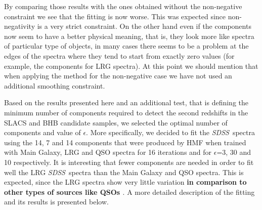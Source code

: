 \documentclass[12pt,preprint]{aastex}
\newcommand{\project}[1]{\textsl{#1}}
\newcommand{\sdss}{\project{SDSS}}
\newcommand{\SDSS}{\sdss}
\begin{document}
By comparing those results with the ones obtained without the
non-negative constraint we see that the fitting is now worse. This was
expected since non-negativity is a very strict constraint. On the
other hand even if the components now seem to have a better physical
meaning, that is, they look more like spectra of particular type of
objects, in many cases there seems to be a problem at the edges of the
spectra where they tend to start from exactly zero values (for
example, the components for LRG spectra). At this point we should
mention that when applying the method for the non-negative case we
have not used an additional smoothing constraint.

Based on the results presented here and an additional test, that is 
defining the minimum number of components required to detect the 
second redshifts in the SLACS and BHB candidate samples, we selected 
the optimal number of components and value of $\epsilon$. More specifically, 
we decided to fit the \SDSS\ spectra using the 14, 7 and 14 components 
that were produced by HMF when trained with Main Galaxy, LRG
and QSO spectra for 16 iterations and for $\epsilon$=3, 30 and 10
respectively. It is interesting that fewer components are needed in
order to fit well the LRG \SDSS\ spectra than the Main
Galaxy and QSO spectra.  This is expected, since the LRG spectra show
very little variation \citep{eishogg} \textbf{in comparison to other 
types of sources like QSOs \citep{yip}}. A more detailed description of
the fitting and its results is presented below.
\end{document}
